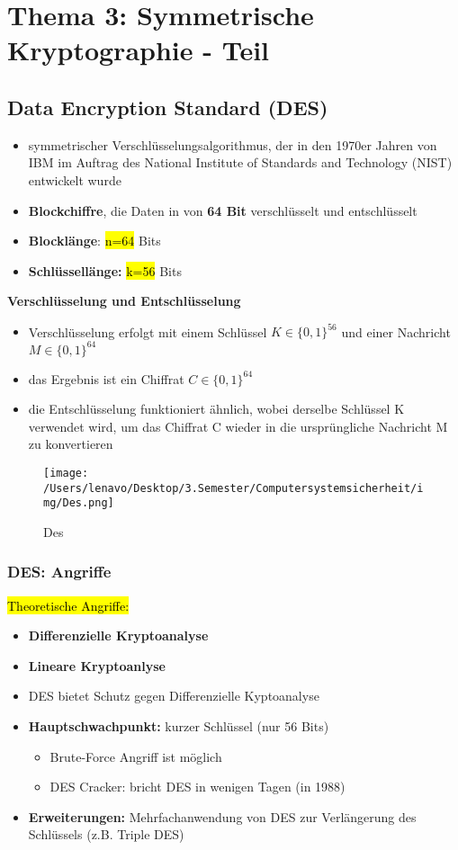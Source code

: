 \documentclass[a4paper, 10pt]{article}
\begin{document}
\section{Thema 3: Symmetrische Kryptographie - Teil }
\subsection{Data Encryption Standard (DES)}
\begin{itemize}
    \item symmetrischer Verschlüsselungsalgorithmus, der in den 1970er Jahren von IBM im Auftrag des National Institute of Standards and Technology (NIST) entwickelt wurde 
    \item \textbf{Blockchiffre}, die Daten in  von \textbf{64 Bit} verschlüsselt und entschlüsselt
    \item \textbf{Blocklänge}: \hl{n=64} Bits
    \item \textbf{Schlüssellänge:} \hl{k=56} Bits
\end{itemize}
\textbf{Verschlüsselung und Entschlüsselung}
\begin{itemize}
    \item Verschlüsselung erfolgt mit einem Schlüssel $K \in \{0,1\}^{56}$ und einer Nachricht $M \in\{0,1\}^{64}$
    \item das Ergebnis ist ein Chiffrat $C \in \{ 0,1\}^{64}$
    \item die Entschlüsselung funktioniert ähnlich, wobei derselbe Schlüssel K verwendet wird, um das Chiffrat C wieder in die ursprüngliche Nachricht M zu konvertieren
\end{itemize}
\newpage
\begin{figure}[h]
    \centering
    \texttt{[image: /Users/lenavo/Desktop/3.Semester/Computersystemsicherheit/img/Des.png]}
    \caption{Des}
    \label{fig:enter-label}
\end{figure}

\subsubsection{DES: Angriffe}
\hl{Theoretische Angriffe:}
\begin{itemize}
    \item \textbf{Differenzielle Kryptoanalyse}
    \item \textbf{Lineare Kryptoanlyse}
    \item DES bietet Schutz gegen Differenzielle Kyptoanalyse
    \item \textbf{Hauptschwachpunkt:} kurzer Schlüssel (nur 56 Bits)
    \begin{itemize}
        \item Brute-Force Angriff ist möglich
        \item DES Cracker: bricht DES in wenigen Tagen (in 1988)
        
    \end{itemize}
    \item \textbf{Erweiterungen:} Mehrfachanwendung von DES zur Verlängerung des Schlüssels (z.B. Triple DES)
\end{itemize}
\end{document}
